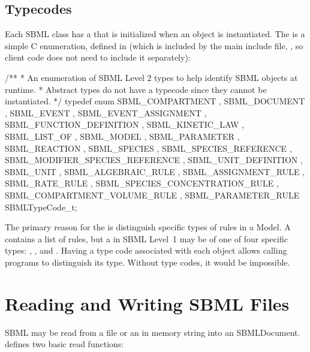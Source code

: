 \documentclass{sbmlmanual}
\begin{document}
\subsection{Typecodes}
\label{sec:typecodes}

Each SBML class has a  that is initialized when
an object is instantiated.  The  is a simple C
enumeration, defined in  (which is included by the
main \libsbml{} include file, , so client code does not
need to include it separately):

\begin{example}[c]
  /**
   * An enumeration of SBML Level 2 types to help identify SBML objects at runtime.
   * Abstract types do not have a typecode since they cannot be instantiated.
   */
  typedef enum
  {
      SBML_COMPARTMENT
    , SBML_DOCUMENT
    , SBML_EVENT
    , SBML_EVENT_ASSIGNMENT
    , SBML_FUNCTION_DEFINITION
    , SBML_KINETIC_LAW
    , SBML_LIST_OF
    , SBML_MODEL
    , SBML_PARAMETER
    , SBML_REACTION
    , SBML_SPECIES
    , SBML_SPECIES_REFERENCE
    , SBML_MODIFIER_SPECIES_REFERENCE
    , SBML_UNIT_DEFINITION
    , SBML_UNIT
    , SBML_ALGEBRAIC_RULE
    , SBML_ASSIGNMENT_RULE
    , SBML_RATE_RULE
    , SBML_SPECIES_CONCENTRATION_RULE
    , SBML_COMPARTMENT_VOLUME_RULE
    , SBML_PARAMETER_RULE
  } SBMLTypeCode_t;
\end{example}

The primary reason for the  is distinguish specific
types of rules in a Model.  A  contains a list of rules,
but a  in SBML Level~1 may be of one of four specific types:
, ,
 and .  Having a type
code associated with each object allows calling programs to distinguish its
type.  Without type codes, it would be impossible.


\section{Reading and Writing SBML Files}
\label{sec:reading-sbml}

SBML may be read from a file or an in memory string into an
SBMLDocument.  \libsbml{} defines two basic read functions:
\end{document}

